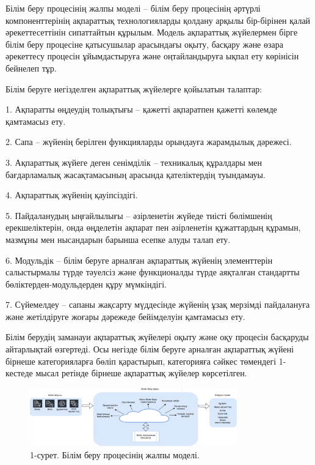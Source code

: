 \begin{multicols}{2}
Білім беру процесінің жалпы моделі -- білім беру процесінің әртүрлі
компоненттерінің ақпараттық технологияларды қолдану арқылы бір-бірінен
қалай әрекеттесеттінін сипаттайтын құрылым. Модель ақпараттық жүйелермен
бірге білім беру процесіне қатысушылар арасындағы оқыту, басқару және
өзара әрекеттесу процесін ұйымдастыруға және оңтайландыруға ықпал ету
көрінісін бейнелеп тұр.

Білім беруге негізделген ақпараттық жүйелерге қойылатын талаптар:

1. Ақпаратты өңдеудің толықтығы -- қажетті ақпаратпен қажетті көлемде
қамтамасыз ету.

2. Сапа -- жүйенің берілген функцияларды орындауға жарамдылық дәрежесі.

3. Ақпараттық жүйеге деген сенімділік -- техникалық құралдары мен
бағдарламалық жасақтамасының арасында қателіктердің туындамауы.

4. Ақпараттық жүйенің қауіпсіздігі.

5. Пайдаланудың ыңғайлылығы -- әзірленетін жүйеде тиісті бөлімшенің
ерекшеліктерін, онда өңделетін ақпарат пен әзірленетін құжаттардың
құрамын, мазмұны мен нысандарын барынша есепке алуды талап ету.

6. Модульдік -- білім беруге арналған ақпараттық жүйенің элементтерін
салыстырмалы түрде тәуелсіз және функционалды түрде аяқталған
стандартты бөліктерден-модульдерден құру мүмкіндігі.

7. Сүйемелдеу -- сапаны жақсарту мүддесінде жүйенің ұзақ мерзімді
пайдалануға және жетілдіруге жоғары дәрежеде бейімделуін қамтамасыз
ету.

Білім берудің заманауи ақпараттық жүйелері оқыту және оқу процесін
басқаруды айтарлықтай өзгертеді. Осы негізде білім беруге арналған
ақпараттық жүйені бірнеше категорияларға бөліп қарастырып, категорияға
сәйкес төмендегі 1-кестеде мысал ретінде бірнеше ақпараттық жүйелер
көрсетілген.
\end{multicols}

\begin{figure}[H]
	\centering
	\includegraphics[width=0.8\textwidth]{media/ict/image99}
	\caption*{1-сурет. Білім беру процесінің жалпы моделі.}
\end{figure}

